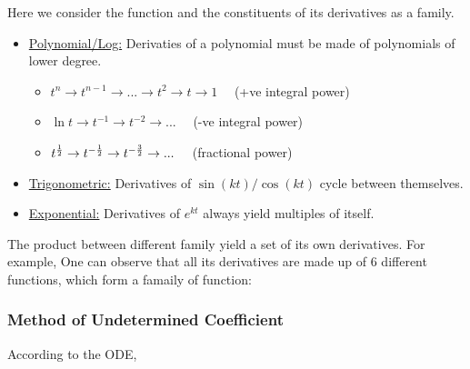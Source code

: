 \documentclass[class=article, crop=false, 12pt]{standalone}
\begin{document}
Here we consider the function and the constituents of its derivatives as a family.

\begin{itemize}
    \item \ul{Polynomial/Log:} Derivaties of a polynomial must be made of polynomials of lower degree.
    \begin{itemize}
        \item $t^n \to t^{n-1} \to ...\to t^2 \to t \to 1 \quad$ (+ve integral power)
        \item $\ln t \to t^{-1} \to t^{-2} \to ... \quad$ (-ve integral power)
        \item $t^{\frac{1}{2}} \to t^{-\frac{1}{2}} \to t^{-\frac{3}{2}} \to ...\quad $ (fractional power)
    \end{itemize}

    \item \ul{Trigonometric:} Derivatives of $\sin{(kt)}/\cos{(kt)}$ cycle between themselves.
    
    \item \ul{Exponential:} Derivatives of $e^{kt}$ always yield multiples of itself.
\end{itemize}

The product between different family yield a set of its own derivatives. For example,
One can observe that all its derivatives are made up of 6 different functions,
which form a famaily of function:

\subsubsection{Method of Undetermined Coefficient}

According to the ODE,
\end{document}
